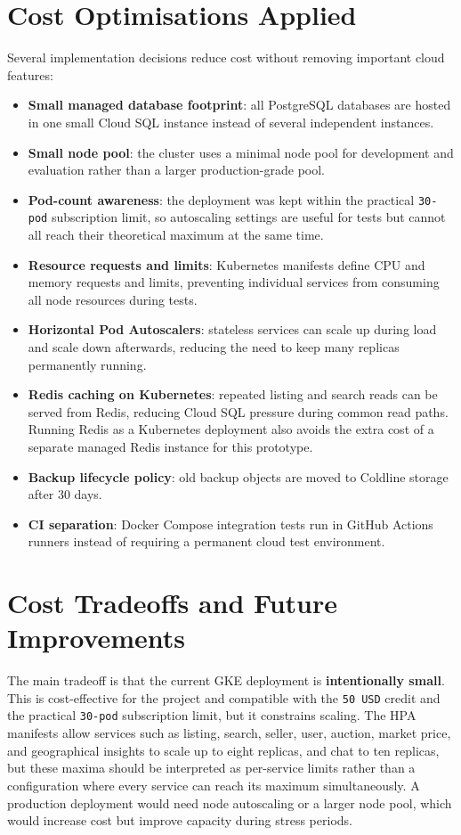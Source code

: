 \section{Cost Optimisations Applied}

Several implementation decisions reduce cost without removing important cloud features:

\begin{itemize}
    \item \textbf{Small managed database footprint}: all PostgreSQL databases are hosted in one small Cloud SQL instance instead of several independent instances.
    \item \textbf{Small node pool}: the cluster uses a minimal node pool for development and evaluation rather than a larger production-grade pool.
    \item \textbf{Pod-count awareness}: the deployment was kept within the practical \texttt{30-pod} subscription limit, so autoscaling settings are useful for tests but cannot all reach their theoretical maximum at the same time.
    \item \textbf{Resource requests and limits}: Kubernetes manifests define CPU and memory requests and limits, preventing individual services from consuming all node resources during tests.
    \item \textbf{Horizontal Pod Autoscalers}: stateless services can scale up during load and scale down afterwards, reducing the need to keep many replicas permanently running.
    \item \textbf{Redis caching on Kubernetes}: repeated listing and search reads can be served from Redis, reducing Cloud SQL pressure during common read paths. Running Redis as a Kubernetes deployment also avoids the extra cost of a separate managed Redis instance for this prototype.
    \item \textbf{Backup lifecycle policy}: old backup objects are moved to Coldline storage after 30 days.
    \item \textbf{CI separation}: Docker Compose integration tests run in GitHub Actions runners instead of requiring a permanent cloud test environment.
\end{itemize}

\section{Cost Tradeoffs and Future Improvements}

The main tradeoff is that the current GKE deployment is \textbf{intentionally small}. This is cost-effective for the project and compatible with the \texttt{50 USD} credit and the practical \texttt{30-pod} subscription limit, but it constrains scaling. The HPA manifests allow services such as listing, search, seller, user, auction, market price, and geographical insights to scale up to eight replicas, and chat to ten replicas, but these maxima should be interpreted as per-service limits rather than a configuration where every service can reach its maximum simultaneously. A production deployment would need node autoscaling or a larger node pool, which would increase cost but improve capacity during stress periods.

